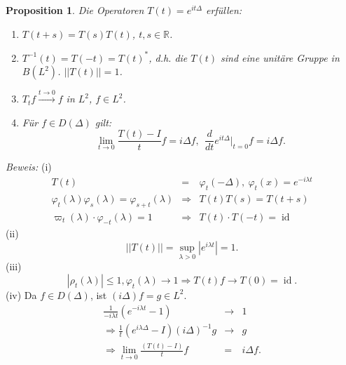 \documentclass[11pt,a4paper,titlepage, ngerman]{scrartcl}
\newtheorem{Prop}[Satz]{Proposition}
\DeclareMathOperator{\id}{id}
\numberwithin{equation}{section}
\newcommand{\R}{\mathbb{R}} %
\newcommand{\m}{\cdot}
\newcommand{\Bew}{\emph{Beweis: }}
\newcommand{\laplace}{\Delta}
\begin{document}
	\begin{Prop}
		Die Operatoren $T(t) = e^{it\laplace}$ erfüllen:
		\begin{enumerate}
			\item[(i)] $T(t+s) = T(s)T(t)$, $t,s\in \R$.
			\item[(ii)] $T^{-1}(t) = T(-t) = T(t)^*$, d.h. die $T(t)$ sind eine unitäre Gruppe in $B(L^{2})$. $||T(t) ||= 1$.
			\item[(iii)] $T_t f\overset{t\rightarrow 0}{\longrightarrow}f$ in $L^2$, $f\in L^2$.
			\item[(iv)] Für $f\in D(\laplace)$ gilt:
			$$\lim\limits_{t\rightarrow 0}\frac{T(t)-I}{t}f = i\laplace f, ~~ \frac{d}{dt}e^{it\laplace}|_{t=0}f = i\laplace f.$$
		\end{enumerate}
	\end{Prop}
	
	\Bew (i) 
	\begin{eqnarray}
		T(t)&=&\varphi_t(-\laplace),~ \varphi_t(x) = e^{-i\lambda t}\nonumber\\
		\varphi_t(\lambda)\varphi_s(\lambda) = \varphi_{s+t}(\lambda)&\Rightarrow& T(t) T(s) = T(t+s)\nonumber\\
		\varpi_t(\lambda)\m\varphi_{-t}(\lambda)= 1&\Rightarrow& T(t)\m T(-t) = \id\nonumber
	\end{eqnarray}
	(ii) 
	$$||T(t)|| = \sup_{\lambda>0}|e^{i\lambda t}| =1.$$
	(iii)
	$$|\rho_t(\lambda)|\leq 1, \varphi_t(\lambda)\rightarrow 1\Rightarrow T(t)f\rightarrow T(0) =\id.$$
	(iv) Da $f\in D(\laplace)$, ist $(i\laplace)f=g\in L^2$.
	\begin{eqnarray}
		\frac{1}{-i\lambda t}(e^{-i\lambda t}-1)&\rightarrow& 1\nonumber\\
		\Rightarrow \frac{1}{t}(e^{i\lambda\laplace}- I)(i\laplace)^{-1}g&\rightarrow& g\nonumber\\
		\Rightarrow \lim\limits_{t\rightarrow 0}\frac{(T(t)-I)}{t}f &=& i\laplace f.\nonumber
	\end{eqnarray}
	
	
	
	
	
	
	
	
	
	
	
	
	
	
	
	
	
	
	
	
	
	
	
	
	
\end{document}
